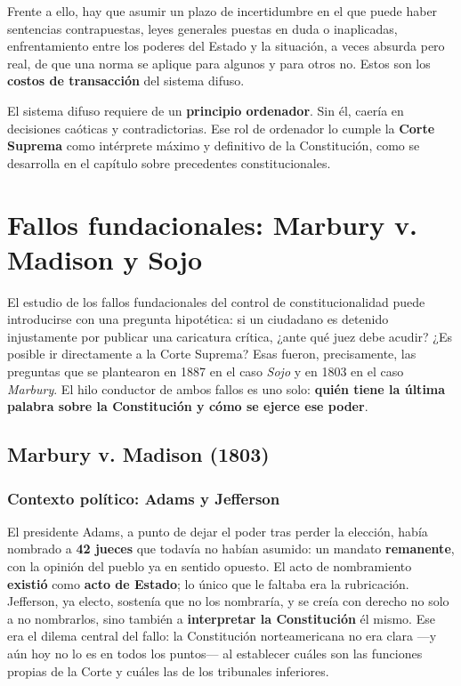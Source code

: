 \documentclass[12pt,oneside]{book}
\begin{document}
Frente a ello, hay que asumir un plazo de incertidumbre en el que puede haber sentencias contrapuestas, leyes generales puestas en duda o inaplicadas, enfrentamiento entre los poderes del Estado y la situación, a veces absurda pero real, de que una norma se aplique para algunos y para otros no. Estos son los \textbf{costos de transacción} del sistema difuso.

\begin{important}
El sistema difuso requiere de un \textbf{principio ordenador}. Sin él, caería en decisiones caóticas y contradictorias. Ese rol de ordenador lo cumple la \textbf{Corte Suprema} como intérprete máximo y definitivo de la Constitución, como se desarrolla en el capítulo sobre precedentes constitucionales.
\end{important}

\chapter[Marbury y Sojo]{Fallos fundacionales: Marbury v. Madison y Sojo}

El estudio de los fallos fundacionales del control de constitucionalidad puede introducirse con una pregunta hipotética: si un ciudadano es detenido injustamente por publicar una caricatura crítica, ¿ante qué juez debe acudir? ¿Es posible ir directamente a la Corte Suprema? Esas fueron, precisamente, las preguntas que se plantearon en 1887 en el caso \emph{Sojo} y en 1803 en el caso \emph{Marbury}. El hilo conductor de ambos fallos es uno solo: \textbf{quién tiene la última palabra sobre la Constitución y cómo se ejerce ese poder}.

\section{Marbury v. Madison (1803)}

\subsection{Contexto político: Adams y Jefferson}

El presidente Adams, a punto de dejar el poder tras perder la elección, había nombrado a \textbf{42 jueces} que todavía no habían asumido: un mandato \textbf{remanente}, con la opinión del pueblo ya en sentido opuesto. El acto de nombramiento \textbf{existió} como \textbf{acto de Estado}; lo único que le faltaba era la rubricación. Jefferson, ya electo, sostenía que no los nombraría, y se creía con derecho no solo a no nombrarlos, sino también a \textbf{interpretar la Constitución} él mismo. Ese era el dilema central del fallo: la Constitución norteamericana no era clara ---y aún hoy no lo es en todos los puntos--- al establecer cuáles son las funciones propias de la Corte y cuáles las de los tribunales inferiores.
\end{document}
